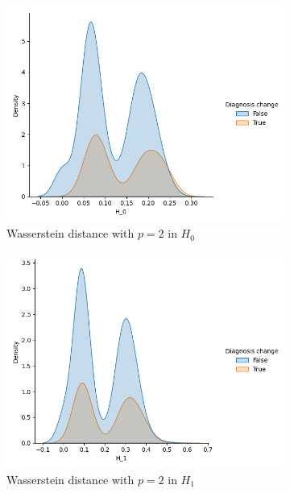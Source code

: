 \documentclass{article}
\begin{document}
\begin{figure}[htb]
  \centering
  \begin{subfigure}{0.32\textwidth}
    \includegraphics[width=\textwidth]{figures/temporal_evolution/wasserstein_H_0_dist_diag_change.png}
    \caption{Wasserstein distance with $p=2$ in $H_0$}
  \end{subfigure}
  \begin{subfigure}{0.32\textwidth}
    \includegraphics[width=\textwidth]{figures/temporal_evolution/wasserstein_H_1_dist_diag_change.png}
    \caption{Wasserstein distance with $p=2$ in $H_1$}
  \end{subfigure}
  \begin{subfigure}{0.32\textwidth}

\end{subfigure}
\end{figure}
\end{document}

